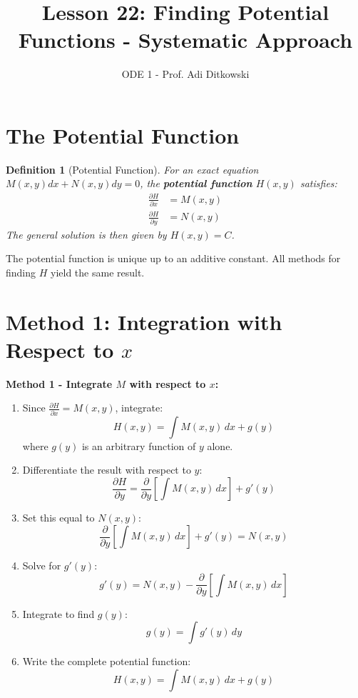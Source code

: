 \documentclass[12pt]{article}
\title{Lesson 22: Finding Potential Functions - Systematic Approach}
\author{ODE 1 - Prof. Adi Ditkowski}
\date{}
\newtheorem{definition}{Definition}
\begin{document}
\maketitle

\section{The Potential Function}

\begin{definition}[Potential Function]
For an exact equation $M(x,y)dx + N(x,y)dy = 0$, the \textbf{potential function} $H(x,y)$ satisfies:
\begin{align}
\frac{\partial H}{\partial x} &= M(x,y) \\
\frac{\partial H}{\partial y} &= N(x,y)
\end{align}
The general solution is then given by $H(x,y) = C$.
\end{definition}

\begin{keypoint}
The potential function is unique up to an additive constant. All methods for finding $H$ yield the same result.
\end{keypoint}

\section{Method 1: Integration with Respect to $x$}

\begin{algorithm}
\textbf{Method 1 - Integrate $M$ with respect to $x$:}
\begin{enumerate}
    \item Since $\frac{\partial H}{\partial x} = M(x,y)$, integrate:
    \[H(x,y) = \int M(x,y)\,dx + g(y)\]
    where $g(y)$ is an arbitrary function of $y$ alone.

    \item Differentiate the result with respect to $y$:
    \[\frac{\partial H}{\partial y} = \frac{\partial}{\partial y}\left[\int M(x,y)\,dx\right] + g'(y)\]

    \item Set this equal to $N(x,y)$:
    \[\frac{\partial}{\partial y}\left[\int M(x,y)\,dx\right] + g'(y) = N(x,y)\]

    \item Solve for $g'(y)$:
    \[g'(y) = N(x,y) - \frac{\partial}{\partial y}\left[\int M(x,y)\,dx\right]\]

    \item Integrate to find $g(y)$:
    \[g(y) = \int g'(y)\,dy\]

    \item Write the complete potential function:
    \[H(x,y) = \int M(x,y)\,dx + g(y)\]
\end{enumerate}
\end{algorithm}
\end{document}
